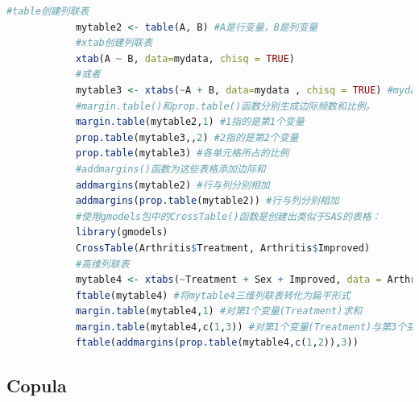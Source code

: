             \begin{lstlisting}[language = R]
            #table创建列联表
            mytable2 <- table(A, B) #A是行变量，B是列变量
            #xtab创建列联表
            xtab(A ~ B, data=mydata, chisq = TRUE)
            #或者
            mytable3 <- xtabs(~A + B, data=mydata , chisq = TRUE) #mydata为一矩阵，需要交叉分类的变量放在"~"右侧，以"+"作为分隔符
            #margin.table()和prop.table()函数分别生成边际频数和比例。
            margin.table(mytable2,1) #1指的是第1个变量
            prop.table(mytable3,,2) #2指的是第2个变量
            prop.table(mytable3) #各单元格所占的比例
            #addmargins()函数为这些表格添加边际和
            addmargins(mytable2) #行与列分别相加
            addmargins(prop.table(mytable2)) #行与列分别相加
            #使用gmodels包中的CrossTable()函数是创建出类似于SAS的表格：
            library(gmodels)
            CrossTable(Arthritis$Treatment, Arthritis$Improved)
            #高维列联表
            mytable4 <- xtabs(~Treatment + Sex + Improved, data = Arthritis)
            ftable(mytable4) #将mytable4三维列联表转化为扁平形式
            margin.table(mytable4,1) #对第1个变量(Treatment)求和
            margin.table(mytable4,c(1,3)) #对第1个变量(Treatment)与第3个变量(Improved)作边际频数
            ftable(addmargins(prop.table(mytable4,c(1,2)),3))
            \end{lstlisting}

    \subsection{Copula}
